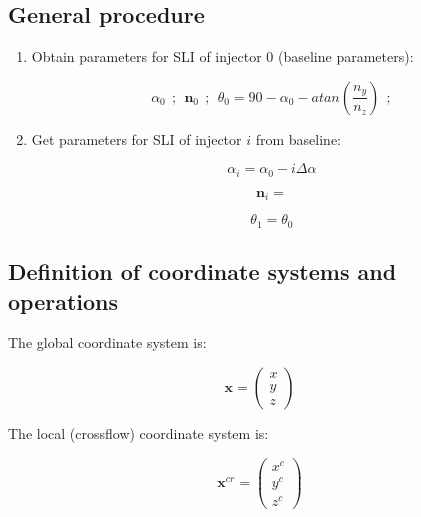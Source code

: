 \subsection{General procedure}

\begin{enumerate}

	\item Obtain parameters for SLI of injector 0 (baseline parameters):
	
	\begin{equation}
	\alpha_0  ~~ ; ~~ \boldsymbol{n}_0 ~~ ; ~~ \theta_0 = 90 - \alpha_0 - atan \left( \frac{n_y}{n_z} \right) ~~ ; 
	\end{equation}

	\item Get parameters for SLI of injector $i$ from baseline:
	
	\begin{equation}
	\alpha_i = \alpha_0 - i \Delta \alpha 
	\end{equation}
	
	\begin{equation}
	\boldsymbol{n}_i = 
	\end{equation}
	
	\begin{equation}
	\theta_1 = \theta_0
	\end{equation}
	

\end{enumerate}

\subsection{Definition of coordinate systems and operations}

The global coordinate system is:

\begin{equation}
\boldsymbol{x} =  \begin{pmatrix} x \\ y \\ z \end{pmatrix}
\end{equation}

The local (crossflow) coordinate system is:

\begin{equation}
\boldsymbol{x}^{cr} = \begin{pmatrix} x^c \\ y^c \\ z^c \end{pmatrix}
\end{equation}

